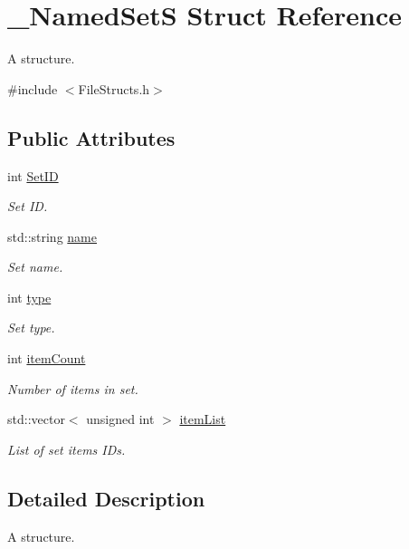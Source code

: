 \hypertarget{struct___named_set_s}{}\section{\+\_\+\+Named\+SetS Struct Reference}
\label{struct___named_set_s}


A structure.  




{\ttfamily \#include $<$File\+Structs.\+h$>$}

\subsection*{Public Attributes}
\begin{DoxyCompactItemize}
\item 
int \hyperlink{struct___named_set_s_a91887154f85a9738aa1d7c313bc3ca3a}{Set\+ID}
\begin{DoxyCompactList}\small\item\em Set ID. \end{DoxyCompactList}\item 
std\+::string \hyperlink{struct___named_set_s_a4490e74ce159285c8cf682c298627261}{name}
\begin{DoxyCompactList}\small\item\em Set name. \end{DoxyCompactList}\item 
int \hyperlink{struct___named_set_s_a4f6ea227fa28a50d54f8ae8bca7f6a17}{type}
\begin{DoxyCompactList}\small\item\em Set type. \end{DoxyCompactList}\item 
int \hyperlink{struct___named_set_s_a2453a0c4e55b896ee5aca2df8ad95ee1}{item\+Count}
\begin{DoxyCompactList}\small\item\em Number of items in set. \end{DoxyCompactList}\item 
std\+::vector$<$ unsigned int $>$ \hyperlink{struct___named_set_s_abc51fae38f5fbec8cd241f03bc753016}{item\+List}
\begin{DoxyCompactList}\small\item\em List of set items I\+Ds. \end{DoxyCompactList}\end{DoxyCompactItemize}


\subsection{Detailed Description}
A structure. 

